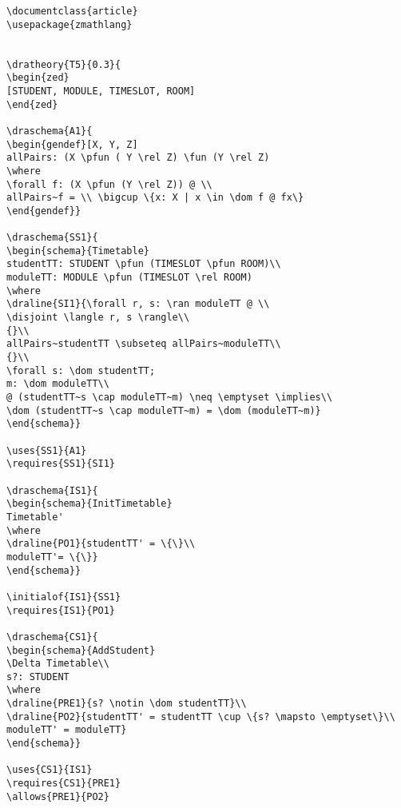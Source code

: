 \begin{verbatim}
\documentclass{article}
\usepackage{zmathlang}


\dratheory{T5}{0.3}{
\begin{zed}
[STUDENT, MODULE, TIMESLOT, ROOM]
\end{zed}

\draschema{A1}{
\begin{gendef}[X, Y, Z]
allPairs: (X \pfun ( Y \rel Z) \fun (Y \rel Z)
\where
\forall f: (X \pfun (Y \rel Z)) @ \\
allPairs~f = \\ \bigcup \{x: X | x \in \dom f @ fx\}
\end{gendef}}

\draschema{SS1}{
\begin{schema}{Timetable}
studentTT: STUDENT \pfun (TIMESLOT \pfun ROOM)\\
moduleTT: MODULE \pfun (TIMESLOT \rel ROOM)
\where
\draline{SI1}{\forall r, s: \ran moduleTT @ \\
\disjoint \langle r, s \rangle\\
{}\\
allPairs~studentTT \subseteq allPairs~moduleTT\\
{}\\
\forall s: \dom studentTT; 
m: \dom moduleTT\\
@ (studentTT~s \cap moduleTT~m) \neq \emptyset \implies\\
\dom (studentTT~s \cap moduleTT~m) = \dom (moduleTT~m)}
\end{schema}}

\uses{SS1}{A1}
\requires{SS1}{SI1}

\draschema{IS1}{
\begin{schema}{InitTimetable}
Timetable'
\where
\draline{PO1}{studentTT' = \{\}\\
moduleTT'= \{\}}
\end{schema}}

\initialof{IS1}{SS1}
\requires{IS1}{PO1}

\draschema{CS1}{
\begin{schema}{AddStudent}
\Delta Timetable\\
s?: STUDENT
\where
\draline{PRE1}{s? \notin \dom studentTT}\\
\draline{PO2}{studentTT' = studentTT \cup \{s? \mapsto \emptyset\}\\
moduleTT' = moduleTT}
\end{schema}}

\uses{CS1}{IS1}
\requires{CS1}{PRE1}
\allows{PRE1}{PO2}


\end{verbatim}
